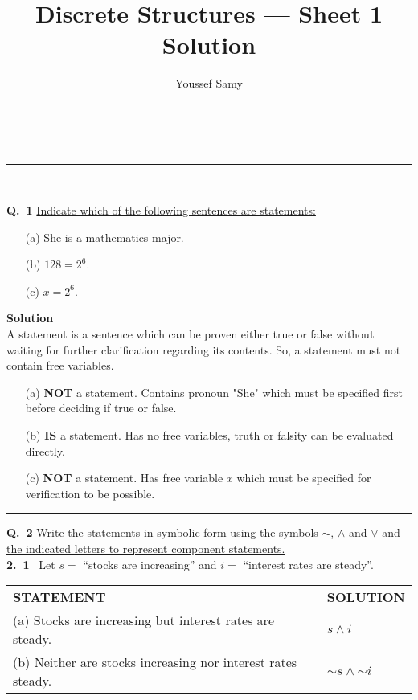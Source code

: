 \documentclass[a4paper,12pt]{article}
\makeatletter
\newcommand{\linia}{\rule{\linewidth}{0.5pt}}
\renewcommand{\maketitle}{
\begin{center}
\vspace{2ex}
{\huge \textbf{\@title}}
\vspace{1ex}
\\
\linia\\
\textsf{\@date \hfill
\@author}
\vspace{4ex}
\end{center}
}
\newcommand*{\ltnot}{\mathord{\sim}}
\makeatother
\begin{document}
\title{Discrete Structures --- Sheet 1 Solution}
\author{Youssef Samy}
\maketitle
\fontsize{14}{16}\selectfont


\noindent \textbf{Q.~1} \ul{Indicate which of the following sentences are statements:}
\begin{itemize}
    \item[(a)] She is a mathematics major.
    \item[(b)] $ 128 = 2^6 $.
    \item[(c)] $ x = 2^6 $.
\end{itemize}

\noindent \textbf{Solution}\\
A statement is a sentence which can be proven either true or false without waiting for further clarification regarding its contents. So, a statement must not contain free variables.
\begin{itemize}
    \item[(a)] \textbf{NOT} a statement. Contains pronoun "She" which must be specified first before deciding if true or false.
    \item[(b)] \textbf{IS} a statement. Has no free variables, truth or falsity can be evaluated directly.
    \item[(c)] \textbf{NOT} a statement. Has free variable $x$ which must be specified for verification to be possible.
\end{itemize}

\begin{center}
    \rule{6cm}{0.4pt}
\end{center}

\noindent \textbf{Q.~2} \ul{Write the statements in symbolic form using the symbols $\sim$, $\land$ and $\lor$ and the indicated letters to represent component statements.}\\

\textbf{2.~1} ~Let $s =$ ``stocks are increasing'' and $i =$ ``interest rates are steady''.
\begin{center}
    {
        \begin{tabular}{m{20em}|l}
            \textbf{STATEMENT}                                           & \textbf{SOLUTION}           \\
            (a) Stocks are increasing but interest rates are steady.     & $s \land i$                 \\
            (b) Neither are stocks increasing nor interest rates steady. & $ \ltnot s \land \ltnot i $
        \end{tabular}}
\end{center}
\end{document}
